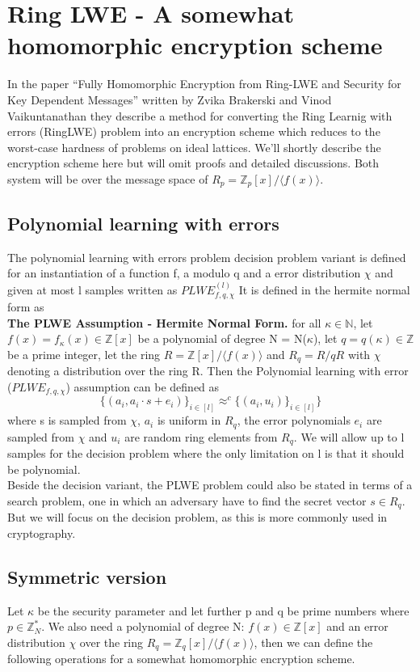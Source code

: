 \documentclass[../main.tex]{subfiles}
\begin{document}
\section{Ring LWE - A somewhat homomorphic encryption scheme} \label{section: RLWE theory}
In the paper ``Fully Homomorphic Encryption from Ring-LWE and Security for Key Dependent Messages'' written by
Zvika Brakerski and Vinod Vaikuntanathan \cite{brakerski2011fully}
they describe a method for converting the Ring Learnig with errors (RingLWE) problem into an encryption scheme
which reduces to the worst-case hardness of problems on ideal lattices.
We'll shortly describe the encryption scheme here but will omit proofs and detailed discussions.
Both system will be over the message space of $R_p = \mathbb{Z}_p[x] / \langle f(x) \rangle $.

\subsection{Polynomial learning with errors}
The polynomial learning with errors problem decision problem variant is defined for an instantiation
of a function f, a modulo q and a error distribution $\chi$ and given at most l samples written as $PLWE_{f, q, \chi}^(l)$
It is defined in the hermite normal form as
\\[2mm]
\textbf{The PLWE Assumption - Hermite Normal Form.}
for all $\kappa \in \mathbb{N}$, let $f(x) = f_{\kappa}(x) \in \mathbb{Z}[x]$
be a polynomial of degree N = N($\kappa$), let $q = q(\kappa) \in \mathbb{Z}$
be a prime integer, let the ring $R = \mathbb{Z}[x] / \langle f(x) \rangle$
and $R_q = R / qR$ with $\chi$ denoting a distribution over the ring R.
Then the Polynomial learning with error ($PLWE_{f,q,\chi}$) assumption can be defined as
\[
    \{ (a_i, a_i \cdot s + e_i) \}_{i \in [l]} \approx^{c} \{(a_i, u_i) \}_{i \in [l]}\}
\]
where s is sampled from $\chi$, $a_i$ is uniform in $R_q$, the error polynomials
$e_i$ are sampled from $\chi$ and $u_i$ are random ring elements from $R_q$.
We will allow up to l samples for the decision problem where the only limitation on l is that it should
be polynomial.
\\[5mm]
Beside the decision variant, the PLWE problem could also be stated in terms of a search problem, one in which
an adversary have to find the secret vector $s \in R_q$. But we will focus on the decision problem, as this
is more commonly used in cryptography.

\subsection{Symmetric version}
Let $\kappa$ be the security parameter and let further p and q be prime numbers where $p \in \mathbb{Z}_N^*$.
We also need a polynomial of degree N: $f(x) \in \mathbb{Z}[x]$ and an error distribution $\chi$ over the ring
$R_q = \mathbb{Z}_q[x] / \langle f(x) \rangle$, then we can define the following operations for a somewhat homomorphic
encryption scheme.
\end{document}
